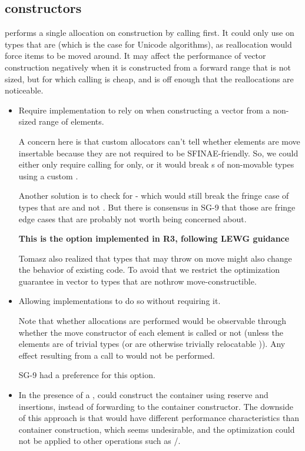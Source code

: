 \documentclass{wg21}
\begin{document}
\subsection{ constructors}

 performs a single allocation on construction by calling  first.
It could only use  on types that are  (which is the case for Unicode algorithms), as reallocation would force items to be moved around.
It may affect the performance of vector construction negatively when it is constructed from a forward range that is not sized, but for which calling  is cheap, and  is off enough that the reallocations are noticeable.

\begin{itemize}
\item Require implementation to rely on  when constructing a vector from a non-sized range of  elements.

A concern here is that custom allocators can't tell whether elements are move insertable because they are not required to be SFINAE-friendly.
So, we could either only require calling  for  only, or it would break s of non-movable types using a custom .

Another solution is to check for  - which would still break the fringe case of types that are  and not .
But there is consensus in SG-9 that those are fringe edge cases that are probably not worth being concerned about.

\textbf{This is the option implemented in R3, following LEWG guidance}

Tomasz also realized that types that may throw on move might also change the behavior of existing code.
To avoid that we restrict the optimization guarantee in vector to types that are nothrow move-constructible.

\item Allowing implementations to do so without requiring it.

    Note that whether allocations are performed would be observable through whether the move constructor of each element is called or not (unless the elements are of trivial types (or are otherwise trivially relocatable )). Any effect resulting from a call to  would not be performed.

    SG-9 had a preference for this option.

\item In the presence of a ,  could construct the container using reserve and insertions, instead of forwarding to the container constructor.
    The downside of this approach is that  would have different performance characteristics than container construction, which seems undesirable, and the optimization could not be applied to other operations such as /.
\end{itemize}
\end{document}
